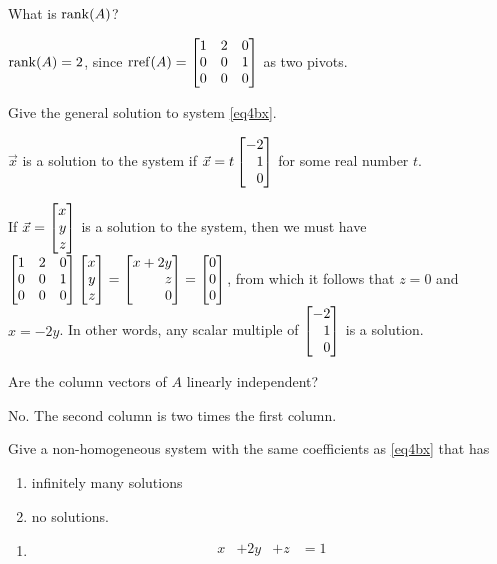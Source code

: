 \documentclass{problemset}
\begin{document}
	\begin{parts}
		\item What is $\operatorname{rank}(A)$?
			\begin{solution}
				$\operatorname{rank}(A)=2$, since $\rref(A)=\mat{1&2&0\\0&0&1\\0&0&0}$ as two pivots.
			\end{solution}
		\item Give the general solution to system \eqref{eq4bx}.
			\begin{solution}
				$\vec x$ is a solution to the system if
				$\vec x=t\mat{-2\\1\\0}$ for some real number $t$.

				If $\vec x=\mat{x\\y\\z}$ is a solution to the system, then we
				must have $\mat{1&2&0\\0&0&1\\0&0&0}\mat{x\\y\\z}=\mat{x+2y\\z\\0}=\mat{0\\0\\0}$,
				from which it follows that $z=0$ and $x=-2y$. In other words,
				any scalar multiple of $\mat{-2\\1\\0}$ is a solution.
			\end{solution}
		\item Are the column vectors of $A$ linearly independent?
			\begin{solution}
				No. The second column is two times the first column.
			\end{solution}
		\item Give a non-homogeneous system with the same coefficients as \eqref{eq4bx} that has
			\begin{enumerate}
				\item infinitely many solutions
				\item no solutions.
			\end{enumerate}
			\begin{solution}
				\begin{enumerate}
					\item
						\begin{equation*}
							\begin{array}{llll}
								x&+2y&+z &= 1\\

\end{array}
\end{equation*}
\end{enumerate}
\end{solution}
\end{parts}
\end{document}
